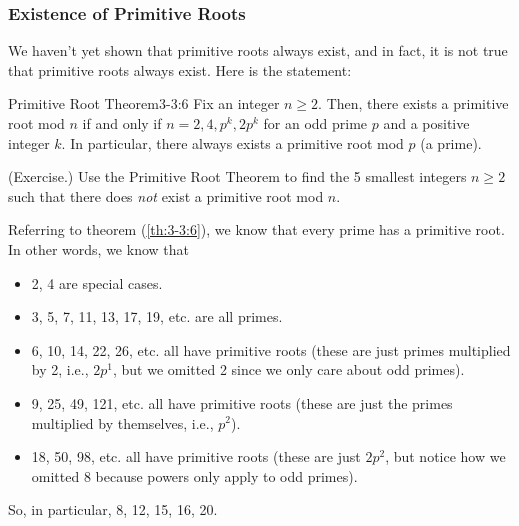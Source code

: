 \documentclass[letterpaper]{article}
\begin{document}
\subsubsection{Existence of Primitive Roots}
We haven't yet shown that primitive roots always exist, and in fact, it is not true that primitive roots always exist. Here is the statement:
\begin{theorem}{Primitive Root Theorem}{3-3:6}
    Fix an integer $n \geq 2$. Then, there exists a primitive root mod $n$ if and only if $n = 2, 4, p^k, 2p^k$ for an odd prime $p$ and a positive integer $k$. In particular, there always exists a primitive root mod $p$ (a prime). 
\end{theorem}

\begin{mdframed}
    (Exercise.) Use the Primitive Root Theorem to find the 5 smallest integers $n \geq 2$ such that there does \emph{not} exist a primitive root mod $n$.

    \begin{mdframed}
        Referring to theorem (\ref{th:3-3:6}), we know that every prime has a primitive root. In other words, we know that 
        \begin{itemize}
            \item 2, 4 are special cases. 
            \item 3, 5, 7, 11, 13, 17, 19, etc. are all primes.
            \item 6, 10, 14, 22, 26, etc. all have primitive roots (these are just primes multiplied by 2, i.e., $2p^1$, but we omitted 2 since we only care about odd primes). 
            \item 9, 25, 49, 121, etc. all have primitive roots (these are just the primes multiplied by themselves, i.e., $p^2$).
            \item 18, 50, 98, etc. all have primitive roots (these are just $2p^2$, but notice how we omitted 8 because powers only apply to odd primes). 
        \end{itemize} 
        So, in particular, 8, 12, 15, 16, 20.
    \end{mdframed}
\end{mdframed}
\end{document}
